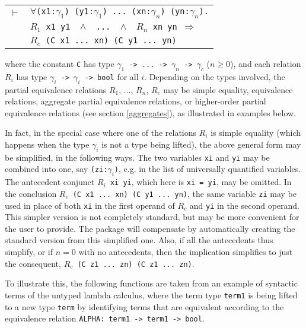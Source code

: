 \documentclass[envcountsame,runningheads]{llncs}
\newcommand{\quotient}{partial equivalence}
\begin{document}
\begin{center}
\begin{tabular}{rl}
$\vdash$&
{\tt $\forall$(x1:$\gamma_1$) (y1:$\gamma_1$) ... (xn:$\gamma_n$) (yn:$\gamma_n$).}
\\
& \hspace{12mm}
{\tt $R_1$ x1 y1 \
$\wedge$ \
... \
$\wedge$ \
$R_n$ xn yn \;$\Rightarrow$
}  \\
& \hspace{12mm}
{\tt $R_c$ (C x1 ... xn) (C y1 ... yn)}  \\
\end{tabular}
\end{center}
where the constant {\tt C} has type
{\tt $\gamma_1$ -> ... -> $\gamma_n$ -> $\gamma_c$} ($n \ge 0$),
and each relation {\tt $R_i$} has type {\tt $\gamma_i$ -> $\gamma_i$ -> bool}
for all $i$.
Depending on the types involved,
the \quotient{} relations $R_1$, ..., $R_n$, $R_c$
may be simple equality, equivalence relations,
aggregate \quotient{} relations,
or higher-order \quotient{} relations (see section \ref{aggregates}),
as illustrated in examples below.

In fact, in the special case where one of the relations $R_i$ is simple
equality (which happens when the type
$\gamma_i$ is not a type being lifted),
the above general form may be simplified, in the following ways.
The two variables {\tt xi} and {\tt yi} may be combined into one,
say {\tt (zi:$\gamma_i$)}, e.g. in the list of universally quantified variables.
The antecedent conjunct {\tt $R_i$ xi yi}, which here is {\tt xi = yi},
may be omitted.  In the conclusion {\tt $R_c$ (C x1 ... xn) (C y1 ... yn)},
the same variable {\tt zi} may be used in place of both {\tt xi} in the first
operand of {\tt $R_c$} and {\tt yi} in the second operand.  This simpler
version is not completely standard, but may be more convenient for
the user to provide.  The package will compensate by automatically
creating the standard version from this simplified one.
Also, if all the antecedents thus simplify,
or if $n = 0$ with no antecedents,
then the implication
simplifies
to just the consequent, {\tt $R_c$ (C z1 ... zn) (C z1 ... zn)}.

To illustrate this, the following functions are taken from an example
of syntactic terms of the untyped lambda calculus,
where the term type {\tt term1}
is being lifted to a new type {\tt term}
by identifying terms that are equivalent
according to the equivalence relation {\tt ALPHA: term1 -> term1 -> bool}.
\end{document}
